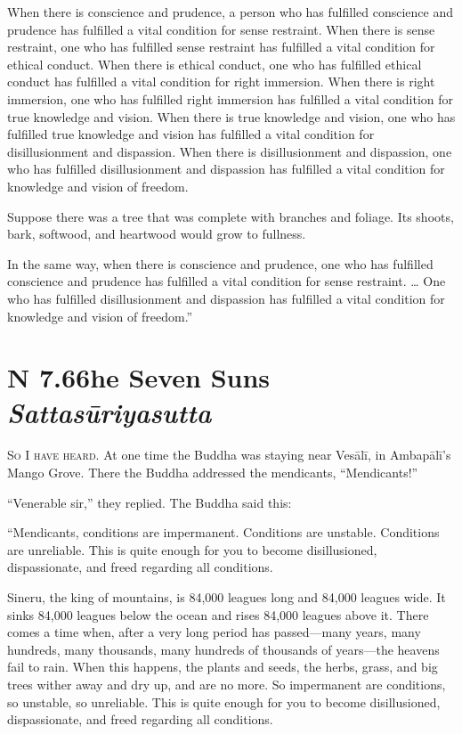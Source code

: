 \documentclass[12pt,openany]{book}%
\newcommand*{\suttatitleacronym}[1]{\smaller[2]{#1}\vspace*{.3em}}
\newcommand*{\suttatitletranslation}[1]{\linebreak{#1}}
\newcommand*{\suttatitleroot}[1]{\linebreak\smaller[2]\itshape{#1}}
\newcommand*{\tocacronym}[1]{\hspace*{-3.3em}{#1}\quad}
\newcommand*{\toctranslation}[1]{#1}
\newcommand*{\tocroot}[1]{(\textit{#1})}
\newcommand*{\scevam}[1]{\textsc{#1}}
\begin{document}
When there is conscience and prudence, a person who has fulfilled conscience and prudence has fulfilled a vital condition for sense restraint. When there is sense restraint, one who has fulfilled sense restraint has fulfilled a vital condition for ethical conduct. When there is ethical conduct, one who has fulfilled ethical conduct has fulfilled a vital condition for right immersion. When there is right immersion, one who has fulfilled right immersion has fulfilled a vital condition for true knowledge and vision. When there is true knowledge and vision, one who has fulfilled true knowledge and vision has fulfilled a vital condition for disillusionment and dispassion. When there is disillusionment and dispassion, one who has fulfilled disillusionment and dispassion has fulfilled a vital condition for knowledge and vision of freedom. 

Suppose there was a tree that was complete with branches and foliage. Its shoots, bark, softwood, and heartwood would grow to fullness. 

In the same way, when there is conscience and prudence, one who has fulfilled conscience and prudence has fulfilled a vital condition for sense restraint. … One who has fulfilled disillusionment and dispassion has fulfilled a vital condition for knowledge and vision of freedom.” 

%
\section*{{\suttatitleacronym AN 7.66}{\suttatitletranslation The Seven Suns }{\suttatitleroot Sattasūriyasutta}}
\addcontentsline{toc}{section}{\tocacronym{AN 7.66} \toctranslation{The Seven Suns } \tocroot{Sattasūriyasutta}}

\scevam{So I have heard. }At one time the Buddha was staying near \textsanskrit{Vesālī}, in \textsanskrit{Ambapālī}’s Mango Grove. There the Buddha addressed the mendicants, “Mendicants!” 

“Venerable sir,” they replied. The Buddha said this: 

“Mendicants, conditions are impermanent. Conditions are unstable. Conditions are unreliable. This is quite enough for you to become disillusioned, dispassionate, and freed regarding all conditions. 

Sineru, the king of mountains, is 84,000 leagues long and 84,000 leagues wide. It sinks 84,000 leagues below the ocean and rises 84,000 leagues above it. There comes a time when, after a very long period has passed—many years, many hundreds, many thousands, many hundreds of thousands of years—the heavens fail to rain. When this happens, the plants and seeds, the herbs, grass, and big trees wither away and dry up, and are no more. So impermanent are conditions, so unstable, so unreliable. This is quite enough for you to become disillusioned, dispassionate, and freed regarding all conditions. 
\end{document}
